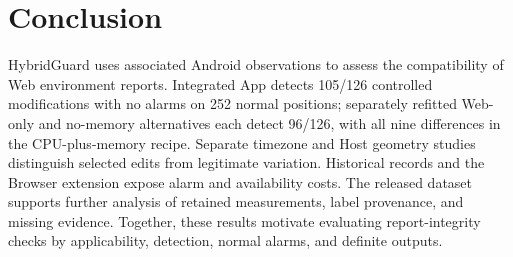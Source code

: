 \hypertarget{sec:7}{%
\section{Conclusion}\label{sec:7}}

HybridGuard uses associated Android observations to assess the compatibility of Web environment reports. Integrated App detects 105/126 controlled modifications with no alarms on 252 normal positions; separately refitted Web-only and no-memory alternatives each detect 96/126, with all nine differences in the CPU-plus-memory recipe. Separate timezone and Host geometry studies distinguish selected edits from legitimate variation. Historical records and the Browser extension expose alarm and availability costs. The released dataset supports further analysis of retained measurements, label provenance, and missing evidence. Together, these results motivate evaluating report-integrity checks by applicability, detection, normal alarms, and definite outputs.
